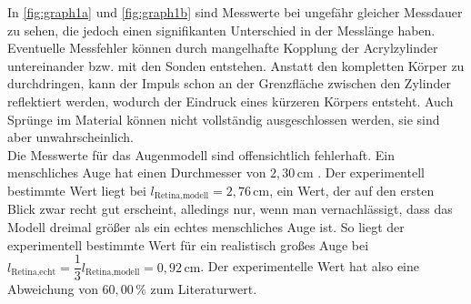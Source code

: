 In \autoref{fig:graph1a} und \autoref{fig:graph1b} sind Messwerte bei ungefähr gleicher Messdauer zu sehen, die jedoch einen signifikanten Unterschied in der Messlänge haben.
Eventuelle Messfehler können durch mangelhafte Kopplung der Acrylzylinder untereinander bzw. mit den Sonden entstehen.
Anstatt den kompletten Körper zu durchdringen, kann der Impuls schon an der Grenzfläche zwischen den Zylinder reflektiert werden,
wodurch der Eindruck eines kürzeren Körpers entsteht. 
Auch Sprünge im Material können nicht vollständig ausgeschlossen werden, sie sind aber unwahrscheinlich. \\

Die Messwerte für das Augenmodell sind offensichtlich fehlerhaft. 
Ein menschliches Auge hat einen Durchmesser von $ 2,30 \, \unit{\centi\meter} $ \cite{ap07}.
Der experimentell bestimmte Wert liegt bei $l_\text{Retina,modell} = 2,76 \,\unit{\centi\meter}$, ein Wert, der auf den ersten Blick zwar recht gut erscheint,
alledings nur, wenn man vernachlässigt, dass das Modell dreimal größer als ein echtes menschliches Auge ist.
So liegt der experimentell bestimmte Wert für ein realistisch großes Auge bei
$ l_\text{Retina,echt} = \dfrac{1}{3} l_\text{Retina,modell} = 0,92 \, \unit{\centi\meter}$.
Der experimentelle Wert hat also eine Abweichung von $ 60,00 \, \% $ zum Literaturwert.